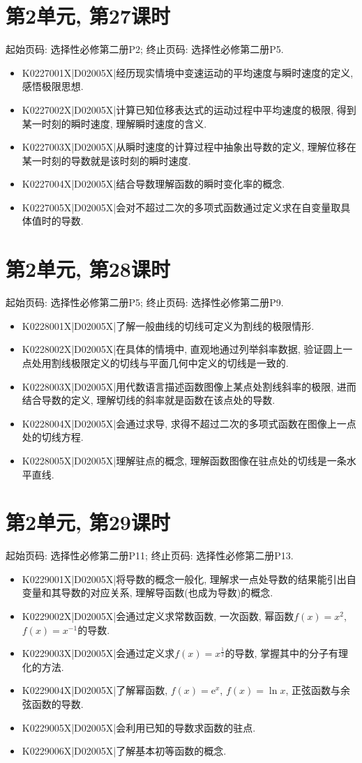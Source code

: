 \section*{第2单元, 第27课时}
起始页码: 选择性必修第二册P2; 终止页码: 选择性必修第二册P5.
\begin{itemize}
\item K0227001X|D02005X|经历现实情境中变速运动的平均速度与瞬时速度的定义, 感悟极限思想.
\item K0227002X|D02005X|计算已知位移表达式的运动过程中平均速度的极限, 得到某一时刻的瞬时速度, 理解瞬时速度的含义.
\item K0227003X|D02005X|从瞬时速度的计算过程中抽象出导数的定义, 理解位移在某一时刻的导数就是该时刻的瞬时速度.
\item K0227004X|D02005X|结合导数理解函数的瞬时变化率的概念.
\item K0227005X|D02005X|会对不超过二次的多项式函数通过定义求在自变量取具体值时的导数.
\end{itemize}

\section*{第2单元, 第28课时}
起始页码: 选择性必修第二册P5; 终止页码: 选择性必修第二册P9.
\begin{itemize}
\item K0228001X|D02005X|了解一般曲线的切线可定义为割线的极限情形.
\item K0228002X|D02005X|在具体的情境中, 直观地通过列举斜率数据, 验证圆上一点处用割线极限定义的切线与平面几何中定义的切线是一致的.
\item K0228003X|D02005X|用代数语言描述函数图像上某点处割线斜率的极限, 进而结合导数的定义, 理解切线的斜率就是函数在该点处的导数.
\item K0228004X|D02005X|会通过求导, 求得不超过二次的多项式函数在图像上一点处的切线方程.
\item K0228005X|D02005X|理解驻点的概念, 理解函数图像在驻点处的切线是一条水平直线.
\end{itemize}

\section*{第2单元, 第29课时}
起始页码: 选择性必修第二册P11; 终止页码: 选择性必修第二册P13.
\begin{itemize}
\item K0229001X|D02005X|将导数的概念一般化, 理解求一点处导数的结果能引出自变量和其导数的对应关系, 理解导函数(也成为导数)的概念.
\item K0229002X|D02005X|会通过定义求常数函数, 一次函数, 幂函数$f(x)=x^2$, $f(x)=x^{-1}$的导数.
\item K0229003X|D02005X|会通过定义求$f(x)=x^\frac 12$的导数, 掌握其中的分子有理化的方法.
\item K0229004X|D02005X|了解幂函数, $f(x)=\mathrm{e}^x$, $f(x)=\ln x$, 正弦函数与余弦函数的导数.
\item K0229005X|D02005X|会利用已知的导数求函数的驻点.
\item K0229006X|D02005X|了解基本初等函数的概念.
\end{itemize}

